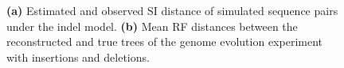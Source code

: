 \documentclass[9pt,english,utf8]{article}
\begin{document}
\FloatBarrier

\begin{figure}[tb]
   



    \caption{\textbf{(a)} Estimated and observed SI distance of simulated
    sequence pairs under the indel model. \textbf{(b)} Mean RF distances
    between the reconstructed and true trees of the genome evolution experiment
    with insertions and deletions.}

\label{fig:results_indel}
\end{figure}


 
 
\end{document}
